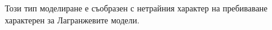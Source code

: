 Този тип моделиране е съобразен с нетрайния характер на пребиваване характерен за Лагранжевите модели.

